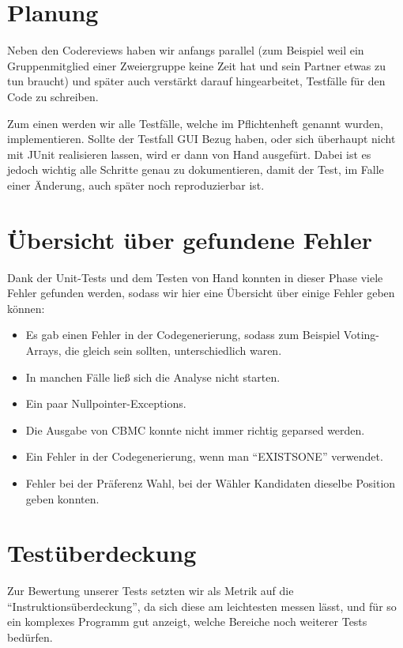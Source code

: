 \documentclass[a4paper]{scrreprt}
\begin{document}
\section{Planung}
Neben den Codereviews haben wir anfangs parallel (zum
Beispiel weil ein Gruppenmitglied einer Zweiergruppe keine Zeit hat und sein
Partner etwas zu tun braucht) und später auch
verstärkt darauf hingearbeitet, Testfälle für den Code zu schreiben.

Zum einen werden wir alle Testfälle, welche im Pflichtenheft genannt wurden,
implementieren. Sollte der Testfall GUI Bezug haben, oder sich überhaupt nicht mit JUnit
realisieren lassen, wird er dann von Hand ausgefürt. Dabei ist es jedoch wichtig alle Schritte genau zu
dokumentieren, damit der Test, im Falle einer Änderung, auch später noch
reproduzierbar ist.

\section{Übersicht über gefundene Fehler}
Dank der Unit-Tests und dem Testen von Hand konnten in dieser Phase viele
Fehler gefunden werden, sodass wir hier eine Übersicht über einige Fehler geben können:

\begin{itemize}
  \item Es gab einen Fehler in der Codegenerierung, sodass zum Beispiel Voting-Arrays, die gleich sein sollten, unterschiedlich waren.
  \item In manchen Fälle ließ sich die Analyse nicht starten.
  \item Ein paar Nullpointer-Exceptions.
  \item Die Ausgabe von CBMC konnte nicht immer richtig geparsed werden.
  \item Ein Fehler in der Codegenerierung, wenn man "`EXISTSONE"' verwendet.
  \item Fehler bei der Präferenz Wahl, bei der Wähler Kandidaten dieselbe
  Position geben konnten.
\end{itemize}


\section{Testüberdeckung}
Zur Bewertung unserer Tests setzten wir als Metrik auf die
"`Instruktionsüberdeckung"', da sich diese am leichtesten messen lässt, und für
so ein komplexes Programm gut anzeigt, welche Bereiche noch weiterer Tests
bedürfen.
\end{document}
